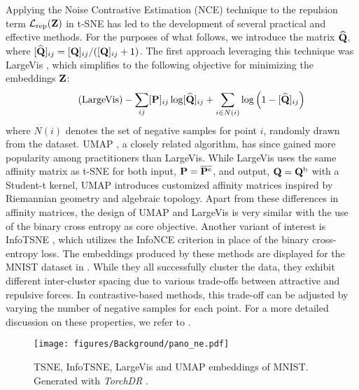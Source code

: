 Applying the Noise Contrastive Estimation (NCE) technique to the repulsion term $\mathcal{L}_{\mathrm{rep}}({\mathbf{Z}})$ in t-SNE has led to the development of several practical and effective methods. For the purposes of what follows, we introduce the matrix $\widehat{{\mathbf{Q}}}$, where $[\widehat{{\mathbf{Q}}}]_{ij} = [{\mathbf{Q}}]_{ij} / ([{\mathbf{Q}}]_{ij} + 1)$. The first approach leveraging this technique was LargeVis \citep{tang2016visualizing}, which simplifies to the following objective for minimizing the embeddings ${\mathbf{Z}}$:
\begin{align}\label{eq:LargeVis_pb}\tag{LargeVis}
    - \sum_{ij} [{\mathbf{P}}]_{ij} \log [\widehat{{\mathbf{Q}}}]_{ij} + \sum_{i \in N(i)} \log \left(1 - [\widehat{{\mathbf{Q}}}]_{ij}\right)
\end{align}
where $N(i)$ denotes the set of negative samples for point $i$, randomly drawn from the dataset. UMAP \citep{mcinnes2018umap}, a closely related algorithm, has since gained more popularity among practitioners than LargeVis. While LargeVis uses the same affinity matrix as t-SNE for both input, $ {\mathbf{P}} = \overline{{\mathbf{P}}^{\mathrm{e}}}$, and output, $ {\mathbf{Q}} = {\mathbf{Q}}^{\mathrm{b}}$ with a Student-t kernel, UMAP introduces customized affinity matrices inspired by Riemannian geometry and algebraic topology. Apart from these differences in affinity matrices, the design of UMAP and LargeVis is very similar with the use of the binary cross entropy as core objective. Another variant of interest is InfoTSNE \citep{damrich2022t}, which utilizes the InfoNCE criterion \citep{oord2018representation} in place of the binary cross-entropy loss. The embeddings produced by these methods are displayed for the MNIST dataset in . While they all successfully cluster the data, they exhibit different inter-cluster spacing due to various trade-offs between attractive and repulsive forces. In contrastive-based methods, this trade-off can be adjusted by varying the number of negative samples for each point. For a more detailed discussion on these properties, we refer to \citep{damrich2022t}.

\begin{figure}[t]
    \centering
    \texttt{[image: figures/Background/pano\_ne.pdf]}
    \caption{TSNE, InfoTSNE, LargeVis and UMAP embeddings of MNIST. Generated with \emph{TorchDR} \citep{vanassel2024torchdr}.}
    \label{fig:pano_ne}
\end{figure}


